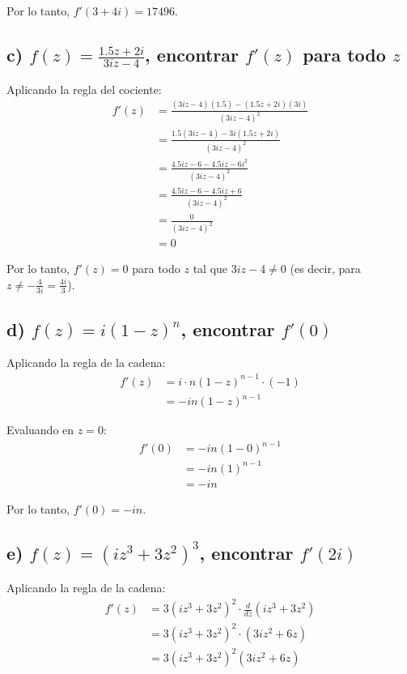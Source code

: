 \documentclass{article}
\begin{document}
Por lo tanto, $f'(3 + 4i) = 17496$.

\subsection*{c) $f(z) = \frac{1.5z + 2i}{3iz - 4}$, encontrar $f'(z)$ para todo $z$}

Aplicando la regla del cociente:
\begin{align*}
f'(z) &= \frac{(3iz - 4)(1.5) - (1.5z + 2i)(3i)}{(3iz - 4)^2} \\
      &= \frac{1.5(3iz - 4) - 3i(1.5z + 2i)}{(3iz - 4)^2} \\
      &= \frac{4.5iz - 6 - 4.5iz - 6i^2}{(3iz - 4)^2} \\
      &= \frac{4.5iz - 6 - 4.5iz + 6}{(3iz - 4)^2} \\
      &= \frac{0}{(3iz - 4)^2} \\
      &= 0
\end{align*}

Por lo tanto, $f'(z) = 0$ para todo $z$ tal que $3iz - 4 \neq 0$ (es decir, para $z \neq -\frac{4}{3i} = \frac{4i}{3}$).

\subsection*{d) $f(z) = i(1 - z)^n$, encontrar $f'(0)$}

Aplicando la regla de la cadena:
\begin{align*}
f'(z) &= i \cdot n(1 - z)^{n-1} \cdot (-1) \\
      &= -in(1 - z)^{n-1}
\end{align*}

Evaluando en $z = 0$:
\begin{align*}
f'(0) &= -in(1 - 0)^{n-1} \\
      &= -in(1)^{n-1} \\
      &= -in
\end{align*}

Por lo tanto, $f'(0) = -in$.

\subsection*{e) $f(z) = (iz^3 + 3z^2)^3$, encontrar $f'(2i)$}

Aplicando la regla de la cadena:
\begin{align*}
f'(z) &= 3(iz^3 + 3z^2)^2 \cdot \frac{d}{dz}(iz^3 + 3z^2) \\
      &= 3(iz^3 + 3z^2)^2 \cdot (3iz^2 + 6z) \\
      &= 3(iz^3 + 3z^2)^2(3iz^2 + 6z)
\end{align*}
\end{document}
